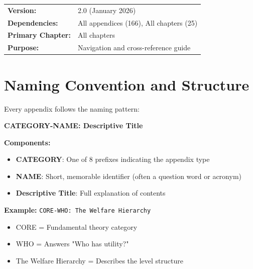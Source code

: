 \begin{tcolorbox}[colback=gray!5!white, colframe=gray!75!black,
    title=Appendix: INDEX | Category: REF]
\small
\begin{tabular}{@{}ll@{}}
\textbf{Version:} & 2.0 (January 2026) \\
\textbf{Dependencies:} & All appendices (166), All chapters (25) \\
\textbf{Primary Chapter:} & All chapters \\
\textbf{Purpose:} & Navigation and cross-reference guide \\
\end{tabular}
\end{tcolorbox}

\section{Naming Convention and Structure}
\label{sec:index-convention}

\begin{tcolorbox}[colback=blue!5!white, colframe=blue!75!black, 
    title=Appendix Naming Convention]
    
Every appendix follows the naming pattern:

\begin{center}
\textbf{CATEGORY-NAME: Descriptive Title}
\end{center}

\textbf{Components:}
\begin{itemize}[nosep]
\item \textbf{CATEGORY}: One of 8 prefixes indicating the appendix type
\item \textbf{NAME}: Short, memorable identifier (often a question word or acronym)
\item \textbf{Descriptive Title}: Full explanation of contents
\end{itemize}

\textbf{Example:} \texttt{CORE-WHO: The Welfare Hierarchy}
\begin{itemize}[nosep]
\item CORE = Fundamental theory category
\item WHO = Answers "Who has utility?"
\item The Welfare Hierarchy = Describes the level structure
\end{itemize}

\end{tcolorbox}

